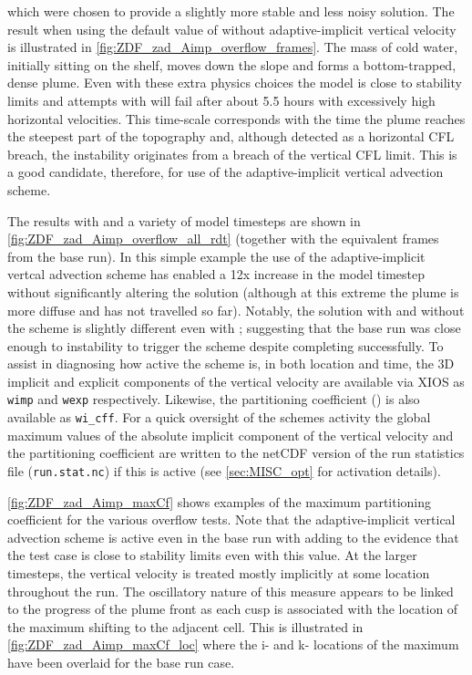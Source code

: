 \documentclass[../main/NEMO_manual]{subfiles}
\begin{document}
\noindent which were chosen to provide a slightly more stable and less noisy solution. The
result when using the default value of  without adaptive-implicit
vertical velocity is illustrated in \autoref{fig:ZDF_zad_Aimp_overflow_frames}. The mass of
cold water, initially sitting on the shelf, moves down the slope and forms a
bottom-trapped, dense plume. Even with these extra physics choices the model is close to
stability limits and attempts with  will fail after about 5.5 hours
with excessively high horizontal velocities. This time-scale corresponds with the time the
plume reaches the steepest part of the topography and, although detected as a horizontal
CFL breach, the instability originates from a breach of the vertical CFL limit. This is a good
candidate, therefore, for use of the adaptive-implicit vertical advection scheme.

The results with  and a variety of model timesteps
are shown in \autoref{fig:ZDF_zad_Aimp_overflow_all_rdt} (together with the equivalent
frames from the base run).  In this simple example the use of the adaptive-implicit
vertcal advection scheme has enabled a 12x increase in the model timestep without
significantly altering the solution (although at this extreme the plume is more diffuse
and has not travelled so far).  Notably, the solution with and without the scheme is
slightly different even with ; suggesting that the base run was
close enough to instability to trigger the scheme despite completing successfully.
To assist in diagnosing how active the scheme is, in both location and time, the 3D
implicit and explicit components of the vertical velocity are available via XIOS as
\texttt{wimp} and \texttt{wexp} respectively.  Likewise, the partitioning coefficient
(\cf) is also available as \texttt{wi\_cff}. For a quick oversight of
the schemes activity the global maximum values of the absolute implicit component
of the vertical velocity and the partitioning coefficient are written to the netCDF
version of the run statistics file (\texttt{run.stat.nc}) if this is active (see
\autoref{sec:MISC_opt} for activation details).

\autoref{fig:ZDF_zad_Aimp_maxCf} shows examples of the maximum partitioning coefficient for
the various overflow tests.  Note that the adaptive-implicit vertical advection scheme is
active even in the base run with  adding to the evidence that the
test case is close to stability limits even with this value. At the larger timesteps, the
vertical velocity is treated mostly implicitly at some location throughout the run. The
oscillatory nature of this measure appears to be linked to the progress of the plume front
as each cusp is associated with the location of the maximum shifting to the adjacent cell.
This is illustrated in \autoref{fig:ZDF_zad_Aimp_maxCf_loc} where the i- and k- locations of the
maximum have been overlaid for the base run case.
\end{document}
